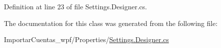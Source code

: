 Definition at line 23 of file Settings.\-Designer.\-cs.



The documentation for this class was generated from the following file\-:\begin{DoxyCompactItemize}
\item 
Importar\-Cuentas\-\_\-wpf/\-Properties/\hyperlink{_importar_cuentas__wpf_2_properties_2_settings_8_designer_8cs}{Settings.\-Designer.\-cs}\end{DoxyCompactItemize}
